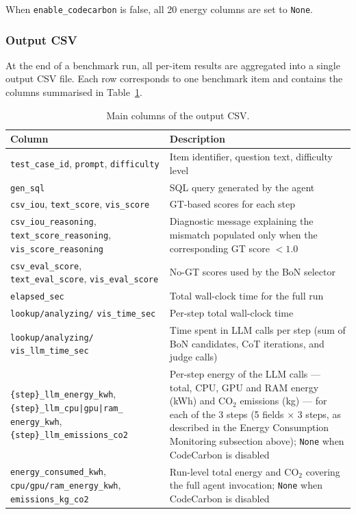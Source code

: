\noindent When \texttt{enable\_codecarbon} is false, all 20 energy columns are set
to \texttt{None}.

\subsubsection{Output CSV}

At the end of a benchmark run, all per-item results are aggregated into a single
output CSV file. Each row corresponds to one benchmark item and
contains the columns summarised in Table~\ref{tab:output_cols}.

\begin{table}[H]
\centering
{}
\begin{tabular}{|p{5cm}|p{7.5cm}|}
\hline
\rowcolor{bluePoli!30}
\textbf{Column} & \textbf{Description} \T\B \\
\hline
\texttt{test\_case\_id}, \texttt{prompt}, \texttt{difficulty} & Item identifier, question text, difficulty level \T\B \\
\hline
\texttt{gen\_sql} & SQL query generated by the agent \T\B \\
\hline
\texttt{csv\_iou}, \texttt{text\_score}, \texttt{vis\_score} & GT-based scores for each step \T\B \\
\hline
\texttt{csv\_iou\_reasoning}, \texttt{text\_score\_reasoning}, \texttt{vis\_score\_reasoning} & Diagnostic message explaining the mismatch populated only when the corresponding GT score $< 1.0$ \T\B \\
\hline
\texttt{csv\_eval\_score}, \texttt{text\_eval\_score}, \texttt{vis\_eval\_score} & No-GT scores used by the BoN selector \T\B \\
\hline
\texttt{elapsed\_sec} & Total wall-clock time for the full run \T\B \\
\hline
\texttt{lookup/analyzing/} \texttt{vis\_time\_sec} & Per-step total wall-clock time \T\B \\
\hline
\texttt{lookup/analyzing/} \texttt{vis\_llm\_time\_sec} & Time spent in LLM calls per step (sum of BoN candidates, CoT iterations, and judge calls) \T\B \\
\hline
\texttt{\{step\}\_llm\_energy\_kwh}, \texttt{\{step\}\_llm\_{cpu|gpu|ram}\_} \texttt{energy\_kwh}, \texttt{\{step\}\_llm\_emissions\_co2} & Per-step energy of the LLM calls --- total, CPU, GPU and RAM energy (kWh) and CO$_2$ emissions (kg) --- for each of the 3 steps (5 fields $\times$ 3 steps, as described in the Energy Consumption Monitoring subsection above); \texttt{None} when CodeCarbon is disabled \T\B \\
\hline
\texttt{energy\_consumed\_kwh}, \texttt{cpu/gpu/ram\_energy\_kwh}, \texttt{emissions\_kg\_co2} & Run-level total energy and CO$_2$ covering the full agent invocation; \texttt{None} when CodeCarbon is disabled \T\B \\
\hline
\end{tabular}
\caption{Main columns of the output CSV.}
\label{tab:output_cols}
\end{table}

\FloatBarrier
